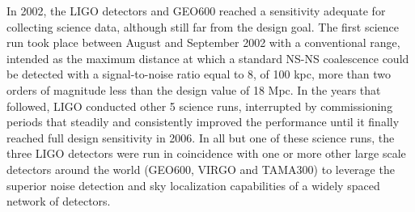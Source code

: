 In 2002, the LIGO detectors and GEO600 reached a sensitivity adequate for collecting science data, although still far from the design goal.
The first science run took place between August and September 2002 with a conventional range, intended as the maximum distance at which a standard NS-NS coalescence could be detected with a signal-to-noise ratio equal to 8, of 100 kpc, more than two orders of magnitude less than the design value of 18 Mpc.
In the years that followed, LIGO conducted other 5 science runs, interrupted by commissioning periods that steadily and consistently improved the performance until it finally reached full design sensitivity in 2006. In all but one of these science runs, the three LIGO detectors were run in coincidence with one or more other large scale detectors around the world (GEO600, VIRGO and TAMA300) to leverage the superior noise detection and sky localization capabilities of a widely spaced network of detectors\cite{Abbott_2004,Abbott_2005,Abbott_2006,Abbott_2008,Abadie_2010}.

